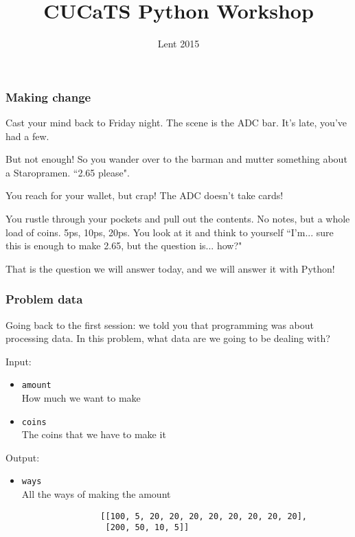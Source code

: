 \documentclass[handout]{beamer}
\title{CUCaTS Python Workshop}
\date{Lent 2015}
\begin{document}
	\begin{frame}[fragile]
		\frametitle{Making change}
		\footnotesize
		Cast your mind back to Friday night. The scene is the ADC bar. It's late, you've had a few.
		
		But not enough! So you wander over to the barman and mutter something about a Staropramen. ``2.65 please".
		
		You reach for your wallet, but crap! The ADC doesn't take cards!
		
		You rustle through your pockets and pull out the contents. No notes, but a whole load of coins. 5ps, 10ps, 20ps. You look at it and think to yourself ``I'm... sure this is enough to make 2.65, but the question is... how?"
		
		That is the question we will answer today, and we will answer it with Python!
	\end{frame}

	\begin{frame}[fragile]
		\frametitle{Problem data}
		
		Going back to the first session: we told you that programming was about processing data. In this problem, what data are we going to be dealing with?
		
		\pause
		
		Input:
		\begin{itemize}
			\item \lstinline|amount| \\
			      How much we want to make
			\item \lstinline|coins| \\
			      The coins that we have to make it
		\end{itemize}
		
		\pause
		
		Output:
		\begin{itemize}
			\item \lstinline|ways| \\
			      All the ways of making the amount
				\begin{lstlisting}
				[[100, 5, 20, 20, 20, 20, 20, 20, 20, 20],
				 [200, 50, 10, 5]]
				\end{lstlisting}
		\end{itemize}
	\end{frame}
		
\end{document}
